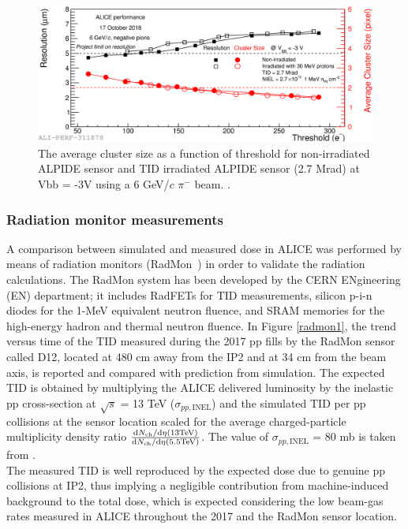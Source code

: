 \begin{figure}[H]
\centering
\includegraphics[width=1.\linewidth]{figures/SensorSimulation/posres.png}
\caption{The average cluster size as a function of threshold for non-irradiated ALPIDE sensor and TID irradiated ALPIDE sensor (2.7 Mrad) at Vbb = -3V using a 6 GeV/$c$  $\pi^{-}$ beam. \cite{Kushpil}.}
\label{posres}
\end{figure}


\subsubsection{Radiation monitor measurements}

A comparison between simulated and measured dose in ALICE was performed by means of radiation monitors (RadMon~\cite{radmon}) in order to validate the radiation calculations.
The RadMon system has been developed by the CERN ENgineering (EN) department; it includes RadFETs for TID measurements, silicon p-i-n diodes for the 1-MeV equivalent neutron fluence, and SRAM memories for the high-energy hadron and 
thermal neutron fluence. 
In Figure \ref{radmon1}, the trend versus time of the TID measured during the 2017 pp fills by the RadMon sensor called D12, located at 480 cm away from the IP2 and at 34 cm from the beam axis, is reported and compared with prediction from simulation. 
The expected TID is obtained by multiplying the ALICE delivered luminosity by the inelastic pp cross-section at $\sqrt{s}$ = 13 TeV ($\sigma_{pp,\mathrm{INEL}}$) and the simulated TID per pp collisions at the sensor location scaled for the average charged-particle multiplicity density ratio $\frac{\mathrm{d}N_{\rm ch}/\mathrm{d}\eta(\rm{13 TeV})}{\mathrm{d}N_{\rm ch}/\mathrm{d}\eta(\rm{5.5 TeV})}$. The value of $\sigma_{pp,\mathrm{INEL}}$ = 80 mb is taken from \cite{sigma1, sigma2}.\\
The measured TID is well reproduced by the expected dose due to genuine pp collisions at IP2, thus implying a negligible contribution from machine-induced background to the total dose, which is expected considering the low beam-gas rates measured in ALICE throughout the 2017 and the RadMon sensor location.

